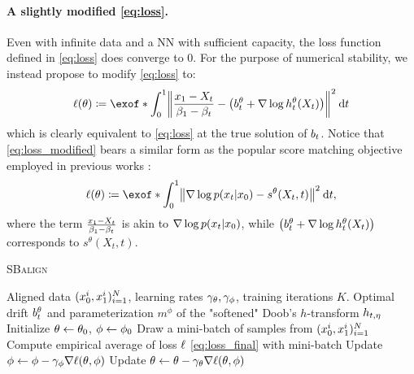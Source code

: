\paragraph{A slightly modified \eqref{eq:loss}.}
Even with infinite data and a \acrlong{NN} with sufficient capacity, the loss function defined in \eqref{eq:loss} does converge to 0. For the purpose of numerical stability, we instead propose to modify \eqref{eq:loss} to:
\begin{equation}
\label{eq:loss_modified}
\Loss(\theta) \defeq \exof*{\int_0^1 \norm*{\frac{\x_1-X_t}{\cvolat[\horizon]-\cvolat[\ctime]}- \left(\fdrift^\theta + \nabla \log \doob^\theta(X_t)\right)}^2 \dt  }
\end{equation}which is clearly equivalent to \eqref{eq:loss} at the true solution of $\fdrift$. Notice that \eqref{eq:loss_modified} bears a similar form as the popular score matching objective employed in previous works \citep{song2019generative,song2020score}:
\begin{equation}
\label{eq:score_matching}
\Loss(\theta) \defeq \exof*{\int_0^1 \norm*{\nabla \log p(\x_t | \x_0)- s^\theta(X_t, t)}^2 \dt  },
\end{equation}
where the term $\frac{\x_1-X_t}{\cvolat[\horizon]-\cvolat[\ctime]}$ is akin to $\nabla \log p(\x_t | \x_0)$, while $\left(\fdrift^\theta + \nabla \log \doob^\theta(X_t)\right)$ corresponds to $s^\theta(X_t, t)$. 

 \begin{algorithm}[t]
   \caption{\textsc{SBalign}}
   \label{alg:SBalign}
\begin{algorithmic}
    Aligned data $(\x^i_0,\x^i_1)_{i=1}^N$, learning rates $\lrf,\lrb$, training iterations $K$. %
    Optimal drift $\fdrift^\theta$ and parameterization $m^{\phi}$ of the "softened" Doob's $h$-transform $\doobs$
\smallskip
   \STATE Initialize $\paramf \subs \paramf_0$, $\paramb \subs \paramb_0$
   \STATE Draw a mini-batch of samples from $(\x^i_0,\x^i_1)_{i=1}^N$
   \STATE Compute empirical average of loss $\Loss$ \eqref{eq:loss_final} with mini-batch
   \STATE Update $\paramb \subs \paramb - \lrb\nabla \Loss(\theta,\phi)$
   \STATE Update $\paramf \subs \paramf - \lrf\nabla \Loss(\theta,\phi)$
   \ENDFOR
\end{algorithmic}
\end{algorithm}

